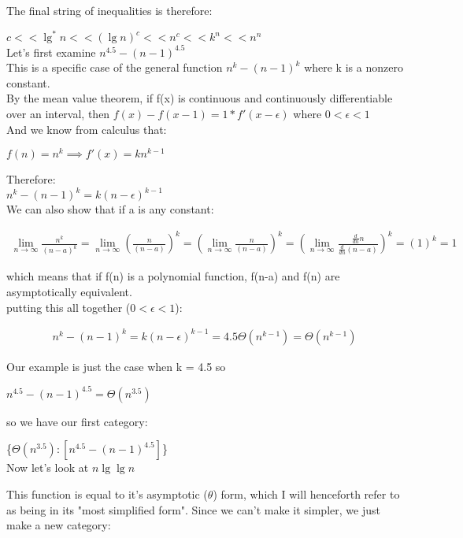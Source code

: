 \documentclass[11pt,fleqn]{article}
\theoremstyle{definition}
\theoremstyle{remark}
\begin{document}
The final string of inequalities is therefore:

$c << \lg^*n << ({\lg n})^c << n^{c} << k^{n} << n^n$\\

Let's first examine $n^{4.5} - (n - 1)^{4.5}$\\

This is a specific case of the general function $n^{k} - (n - 1)^{k}$
where k is a nonzero constant.\\

By the mean value theorem, if f(x) is continuous and 
continuously differentiable over an interval, then 
$f(x) - f(x - 1) = 1 * f'(x - \epsilon)$ where $0 < \epsilon < 1$\\

And we know from calculus that:

$f(n) = n^{k} \implies f'(x) = kn^{k-1}$

Therefore:\\ 

$n^{k} - (n - 1)^{k} = k(n - \epsilon)^{k-1}$\\

We can also show that if a is any constant: 

\begin{align*}
\lim_{n \to \infty} \frac{n^{k}}{(n-a)^{k}} = 
\lim_{n \to \infty} (\frac{n}{(n-a)})^{k} = 
(\lim_{n \to \infty} \frac{n}{(n-a)})^{k} = 
(\lim_{n \to \infty} \frac{\frac{d}{dn}n}{\frac{d}{dn}(n-a)})^{k} = 
(1)^{k} = 
1
\end{align*}

which means that if f(n) is a polynomial function, f(n-a) and f(n)
are asymptotically equivalent.\\

putting this all together ($0 < \epsilon < 1$):

\begin{align*}
n^{k} - (n - 1)^{k} = 
k(n-\epsilon)^{k - 1} =
4.5\Theta(n^{k - 1}) = 
\Theta(n^{k - 1})
\end{align*}

Our example is just the case when k = 4.5 so

$n^{4.5} - (n - 1)^{4.5} = \Theta(n^{3.5})$

so we have our first category:

\{$\Theta(n^{3.5}): [n^{4.5} - (n - 1)^{4.5}]$\}\\

Now let's look at $n \lg \lg n$

This function is equal to it's asymptotic ($\theta$) form, 
which I will henceforth refer to as being in its "most simplified form".
Since we can't make it simpler, we just make a new category:
\end{document}
